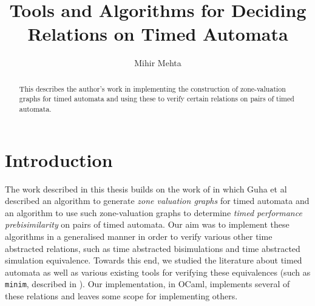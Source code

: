 \documentclass[a4paper]{llncs}
\begin{document}
\mainmatter

\title{Tools and Algorithms for Deciding Relations on Timed Automata}

\author{Mihir Mehta}



\maketitle

\begin{abstract}
  This describes the author's work in implementing the construction of
  zone-valuation graphs for timed automata and using these to verify
  certain relations on pairs of timed automata.
\end{abstract}
\pagebreak

\tableofcontents
\pagebreak
\listoffigures
\listoftables
\pagebreak

\section{Introduction}

The work described in this thesis builds on the work of
\cite{DBLP:conf/cav/GuhaNA12} in which Guha et al described an
algorithm to generate \emph{zone valuation graphs} for timed automata
and an algorithm to use such zone-valuation graphs to determine
\emph{timed performance prebisimilarity} on pairs of timed
automata. Our aim was to implement these algorithms in a generalised
manner in order to verify various other time abstracted relations,
such as time abstracted bisimulations \cite{tripakis2001analysis} and
time abstracted simulation equivalence. Towards
this end, we studied the literature about timed automata as well as
various existing tools for verifying these
equivalences (such as \texttt{minim}, described in
\cite{tripakis2001analysis}). Our implementation, in OCaml, implements
several of these relations and leaves some scope for implementing
others.
\end{document}
